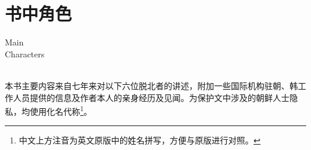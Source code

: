 \fancyhead[RO]{{\tiny{\textcolor{Gray}{\FA \ }}}\thepage}
\fancyhead[LE]{{\tiny{\textcolor{Gray}{\FA \ }}}\thepage}
\fancyfoot[LE,RO]{}
\fancyfoot[LO,CE]{}
\fancyfoot[CO,RE]{}
\chapter*{书中角色}
\vspace{10mm}
\begin{flushright}
	\textcolor{PinYinColor}{\EN \huge{Main\\
	Characters\\
			\ \\}}
\end{flushright}

本书主要内容来自七年来对以下六位脱北者的讲述，附加一些国际机构驻朝、韩工作人员提供的信息及作者本人的亲身经历及见闻。为保护文中涉及的朝鲜人士隐私，均使用化名代称\footnote{中文上方注音为英文原版中的姓名拼写，方便与原版进行对照。}。\\


